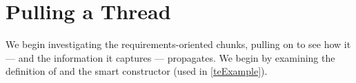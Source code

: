 \section{Pulling a Thread}\label{ciThread}

%

We begin investigating the requirements-oriented chunks, pulling on  to see how it --- and the information it captures --- propagates. We begin by examining the definition of  and the  smart constructor (used in \autoref{teExample}).

